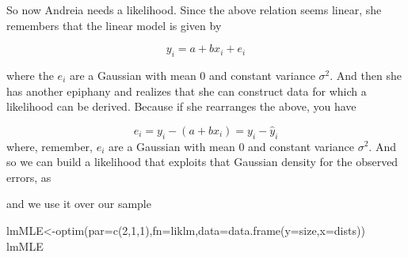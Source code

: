 \documentclass[
]{book}
\newenvironment{Shaded}{\begin{snugshade}}{\end{snugshade}}
\newcommand{\AttributeTok}[1]{\textcolor[rgb]{0.77,0.63,0.00}{#1}}
\newcommand{\CommentTok}[1]{\textcolor[rgb]{0.56,0.35,0.01}{\textit{#1}}}
\newcommand{\ControlFlowTok}[1]{\textcolor[rgb]{0.13,0.29,0.53}{\textbf{#1}}}
\newcommand{\DecValTok}[1]{\textcolor[rgb]{0.00,0.00,0.81}{#1}}
\newcommand{\FunctionTok}[1]{\textcolor[rgb]{0.00,0.00,0.00}{#1}}
\newcommand{\NormalTok}[1]{#1}
\newcommand{\OtherTok}[1]{\textcolor[rgb]{0.56,0.35,0.01}{#1}}
\newcommand{\SpecialCharTok}[1]{\textcolor[rgb]{0.00,0.00,0.00}{#1}}
\begin{document}
So now Andreia needs a likelihood. Since the above relation seems linear, she remembers that the linear model is given by

\[y_i=a+b x_i+e_i\]

where the \(e_i\) are a Gaussian with mean 0 and constant variance \(\sigma^2\). And then she has another epiphany and realizes that she can construct data for which a likelihood can be derived. Because if she rearranges the above, you have

\[e_i=y_i-(a+b x_i)=y_i-\hat y_i\]
where, remember, \(e_i\) are a Gaussian with mean 0 and constant variance \(\sigma^2\). And so we can build a likelihood that exploits that Gaussian density for the observed errors, as

\begin{Shaded}
\end{Shaded}

and we use it over our sample

\begin{Shaded}
\begin{Highlighting}[]
\NormalTok{lmMLE}\OtherTok{\textless{}{-}}\FunctionTok{optim}\NormalTok{(}\AttributeTok{par=}\FunctionTok{c}\NormalTok{(}\DecValTok{2}\NormalTok{,}\DecValTok{1}\NormalTok{,}\DecValTok{1}\NormalTok{),}\AttributeTok{fn=}\NormalTok{liklm,}\AttributeTok{data=}\FunctionTok{data.frame}\NormalTok{(}\AttributeTok{y=}\NormalTok{size,}\AttributeTok{x=}\NormalTok{dists))}
\NormalTok{lmMLE}
\end{Highlighting}
\end{Shaded}
\end{document}
